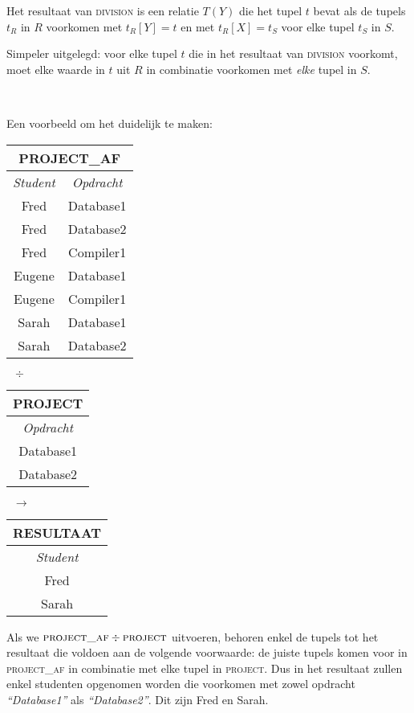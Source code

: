 Het resultaat van \textsc{division} is een relatie $T(Y)$ die het tupel $t$ bevat als de tupels $t_R$ in $R$ voorkomen met $t_R[Y] = t$ en met $t_R[X] = t_S$ voor elke tupel $t_S$ in $S$.

Simpeler uitgelegd: voor elke tupel $t$ die in het resultaat van \textsc{division} voorkomt, moet elke waarde in $t$ uit $R$ in combinatie voorkomen met \textit{elke} tupel in $S$.

~

\noindent Een voorbeeld om het duidelijk te maken:
\begin{center}
\begin{tabular}{|c|c|}
\hline
\multicolumn{2}{|c|}{\textbf{PROJECT\_AF}} \\
\hline
\textit{Student} & \textit{Opdracht} \\ \hline
Fred & Database1 \\ \hline
Fred & Database2 \\ \hline
Fred & Compiler1 \\ \hline
Eugene & Database1 \\ \hline
Eugene & Compiler1 \\ \hline
Sarah & Database1 \\ \hline
Sarah & Database2 \\
\hline
\end{tabular}
$\;\;\div\;\;$
\begin{tabular}{|c|}
\hline
\multicolumn{1}{|c|}{\textbf{PROJECT}} \\
\hline
\textit{Opdracht} \\ \hline
Database1 \\ \hline
Database2 \\
\hline
\end{tabular}
$\;\;\longrightarrow\;\;$
\begin{tabular}{|c|}
\hline
\multicolumn{1}{|c|}{\textbf{RESULTAAT}} \\
\hline
\textit{Student} \\ \hline
Fred \\ \hline
Sarah \\
\hline
\end{tabular}
\end{center}
Als we $\textsc{project\_af} \div \textsc{project}$ uitvoeren, behoren enkel de tupels tot het resultaat die voldoen aan de volgende voorwaarde: de juiste tupels komen voor in \textsc{project\_af} in combinatie met elke tupel in \textsc{project}. Dus in het resultaat zullen enkel studenten opgenomen worden die voorkomen met zowel opdracht \textit{``Database1''} als \textit{``Database2''}. Dit zijn Fred en Sarah.

